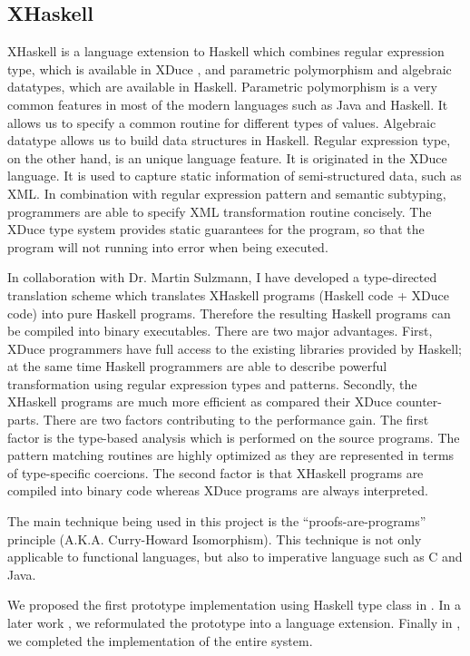 \documentclass[12pt]{article}
\theoremstyle{plain} \numberwithin{equation}{section}
\theoremstyle{definition}
\begin{document}
\subsection{XHaskell}
XHaskell is a language extension to Haskell \cite{xhaskell} 
which combines regular expression type, 
which is available in XDuce \cite{XDuceTyPHD}, and parametric
polymorphism and algebraic datatypes, which are available in Haskell.
Parametric polymorphism is a very common features in most of the 
modern languages such as Java and Haskell. It allows us to specify a
common routine for different types of values. Algebraic datatype
allows us to build data structures in Haskell. Regular expression
type, on the other hand, is an unique language feature. 
It is originated in the XDuce language. It is used to capture
static information of semi-structured data, such as XML. In
combination with regular expression pattern and semantic subtyping,
programmers are able to specify XML transformation routine concisely.
The XDuce type system provides static guarantees for the program, so that
the program will not running into error when being executed. 

In collaboration with Dr. Martin Sulzmann, I have developed a
type-directed translation scheme which translates XHaskell programs
(Haskell code + XDuce code) into pure Haskell programs. Therefore
the resulting Haskell programs can be compiled into binary executables.
There are two major advantages. First, XDuce programmers have full
access to the existing libraries provided by Haskell; at the same
time Haskell programmers are able to describe powerful transformation
using regular expression types and patterns. Secondly, the XHaskell
programs are much more efficient as compared their XDuce counter-parts.
There are two factors contributing to the performance gain. 
The first factor is the type-based analysis which is performed on the 
source programs. The pattern matching routines are highly optimized
as they are represented in terms of type-specific coercions. The second 
factor is that XHaskell programs are compiled into binary code whereas
XDuce programs are always interpreted. 

The main technique being used in this project is the
``proofs-are-programs'' principle (A.K.A. Curry-Howard Isomorphism). 
This technique is not only applicable  to functional
languages, but also to imperative language such as C and Java.

We proposed the first prototype implementation using Haskell type class
in \cite{semantic-subtyping}. In a later work \cite{ml-workshop05}, 
we reformulated the prototype into a language extension. 
Finally in \cite{ifl2007}, we completed the implementation of the entire system.
\end{document}
